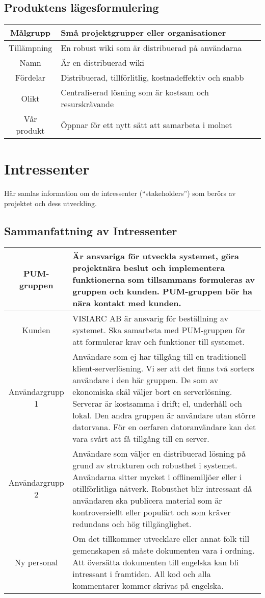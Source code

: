 \subsection{Produktens lägesformulering} %
\begin{tabular}{|c|m{15 cm}|}
\hline
Målgrupp & Små projektgrupper eller organisationer\\
\hline
Tillämpning & En robust wiki som är distribuerad på användarna \\
\hline
Namn & Är en distribuerad wiki  \\
\hline 
Fördelar & Distribuerad, tillförlitlig, kostnadeffektiv och snabb \\
\hline
Olikt & Centraliserad lösning som är kostsam och resurskrävande \\
\hline
Vår produkt & Öppnar för ett nytt sätt att samarbeta i molnet \\
\hline
\end{tabular}
\section{Intressenter}
Här samlas information om de intressenter (``stakeholders'') som berörs av projektet och dess utveckling.
\subsection{Sammanfattning av Intressenter}
\begin{tabular}{|c|m{14 cm}|}
\hline
PUM-gruppen & Är ansvariga för utveckla systemet, göra projektnära beslut och implementera funktionerna som tillsammans formuleras av gruppen och kunden. PUM-gruppen bör ha nära kontakt med kunden. \\ \hline
Kunden & VISIARC AB är ansvarig för beställning av systemet. Ska samarbeta med PUM-gruppen för att formulerar krav och funktioner till systemet. \\ \hline
Användargrupp 1 & Användare som ej har tillgång till en traditionell klient-serverlösning. Vi ser att det finns två sorters användare i den här gruppen. De som av ekonomiska skäl väljer bort en serverlösning. Serverar är kostsamma i drift; el, underhåll och lokal. Den andra gruppen är användare utan större datorvana. För en oerfaren datoranvändare kan det vara svårt att få tillgång till en server. \\ \hline
Användargrupp 2 & Användare som väljer en distribuerad lösning på grund av strukturen och robusthet i systemet. Användarna sitter mycket i offlinemiljöer eller i otillförlitliga nätverk. Robusthet blir intressant då användaren ska publicera material som är kontroversiellt eller populärt och som kräver redundans och hög tillgänglighet.\\ \hline
Ny personal & Om det tillkommer utvecklare eller annat folk till gemenskapen så måste dokumenten vara i ordning. Att översätta dokumenten till engelska kan bli intressant i framtiden. All kod och alla kommentarer kommer skrivas på engelska.  \\ \hline
\end{tabular}
